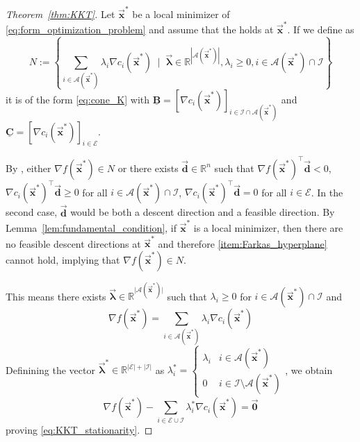 \documentclass[9pt, headings=standardclasses, parskip=half]{scrartcl}
\newcommand{\matr}[1]{\underline{\boldsymbol{#1}}}
\newcommand{\vect}[1]{\vec{\boldsymbol{#1}}}
\newcommand{\R}{\mathbb{R}}
\begin{document}
\begin{proof}[Theorem~\ref{thm:KKT}]
  Let \(\vect{x}^{\ast}\) be a local minimizer of \eqref{eq:form_optimization_problem} and assume that the  holds at \(\vect{x}^{\ast}\).
  If we define as
  \begin{equation}\label{eq:cone_N}
    N := \left\{ \sum_{i\in\mathcal{A}(\vect{x}^{\ast})} \lambda_{i} \nabla c_{i}(\vect{x}^{\ast}) \;\mid\; \vect{\lambda} \in \R^{|\mathcal{A}(\vect{x}^{\ast})|}, \lambda_{i} \ge 0, i\in \mathcal{A}(\vect{x}^{\ast}) \cap \mathcal{I} \right\}
  \end{equation}
  it is of the form \eqref{eq:cone_K} with \(\matr{B} = \left[ \nabla c_{i}(\vect{x}^{\ast}) \right]_{i\in{\mathcal{I}\cap\mathcal{A}(\vect{x}^{\ast})}}\) and \(\matr{C} = \left[ \nabla c_{i}(\vect{x}^{\ast}) \right]_{i\in{\mathcal{E}}}\).
  
  By , either \(\nabla f(\vect{x}^{\ast}) \in N\) or there exists \(\vect{d}\in\R^{n}\) such that \(\nabla f(\vect{x}^{\ast})^{\top} \vect{d} < 0\), \(\nabla c_{i}(\vect{x}^{\ast})^{\top} \vect{d} \ge 0\) for all \(i\in\mathcal{A(\vect{x}^{\ast})} \cap \mathcal{I}\), \(\nabla c_{i}(\vect{x}^{\ast})^{\top} \vect{d} = 0\) for all \(i\in\mathcal{E}\).
  In the second case, \(\vect{d}\) would be both a descent direction and a feasible direction. 
  By Lemma~\ref{lem:fundamental_condition}, if \(\vect{x}^{\ast}\) is a local minimizer, then there are no feasible descent directions at \(\vect{x}^{\ast}\) and therefore \ref{item:Farkas_hyperplane} cannot hold, implying that \(\nabla f(\vect{x}^{\ast}) \in N\).

  This means there exists \(\vect{\lambda} \in \R^{|\mathcal{A(\vect{x}^{\ast})|}}\) such that \(\lambda_{i} \ge 0\) for \(i\in\mathcal{A(\vect{x}^{\ast})} \cap \mathcal{I} \) and
  \begin{equation}\label{eq:grad_linear_combination}
    \nabla f(\vect{x}^{\ast}) = \sum_{i\in\mathcal{A}(\vect{x}^{\ast})} \lambda_{i} \nabla c_{i}(\vect{x}^{\ast})%
  \end{equation}
  Definining the vector \(\vect{\lambda}^{\ast} \in \R^{|\mathcal{E}|+|\mathcal{I}|}\) as 
  \(
    \lambda_{i}^{\ast} = \begin{cases}
      \lambda_{i} & i \in \mathcal{A}(\vect{x}^{\ast}) \\
      0           & i \in \mathcal{I} \setminus \mathcal{A}(\vect{x}^{\ast})
    \end{cases}
  \),
  we obtain
  \begin{equation}\label{eq:KKT_stationarity_proof}
    \nabla f(\vect{x}^{\ast}) - \sum_{i\in\mathcal{E}\cup\mathcal{I}} \lambda_{i}^{\ast} \nabla c_{i}(\vect{x}^{\ast}) = \vect{0}
  \end{equation}
  proving \eqref{eq:KKT_stationarity}.
  

\end{proof}
\end{document}
